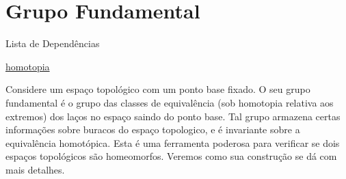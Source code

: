 \section{Grupo Fundamental}
\label{grupo-fundamental}

\begin{titlemize}{Lista de Dependências}
	\item \hyperref[Homotopia]{homotopia}\\ %
\end{titlemize}

Considere um espaço topológico com um ponto base fixado. O seu grupo fundamental é o grupo das classes de equivalência (sob homotopia relativa aos extremos) dos laços no espaço saindo do ponto base. Tal grupo armazena certas informações sobre buracos do espaço topologico, e é invariante sobre a equivalência homotópica. Esta é uma ferramenta poderosa para verificar se dois espaços topológicos são homeomorfos. %
Veremos como sua construção se dá com mais detalhes.










